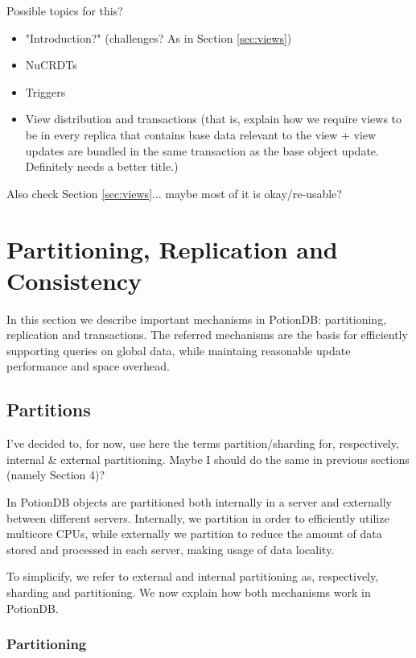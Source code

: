 \documentclass{vldb}
\newcommand{\grumbler}[2]{{\color{red}{\bf #1:} #2}}
\newcommand{\andre}[1]{\grumbler{andre}{#1}}
\begin{document}
\andre{Possible topics for this?}
\begin{itemize}
	\item "Introduction?" (challenges? As in Section \ref{sec:views})
	\item NuCRDTs
	\item Triggers
	\item View distribution and transactions (that is, explain how we require views to be in every replica that contains base data relevant to the view + view updates are bundled in the same transaction as the base object update. Definitely needs a better title.)
\end{itemize}

\andre{Also check Section \ref{sec:views}... maybe most of it is okay/re-usable?}


\section{Partitioning, Replication and Consistency}

In this section we describe important mechanisms in PotionDB: partitioning, replication and transactions.
The referred mechanisms are the basis for efficiently supporting queries on global data, while maintaing reasonable update performance and space overhead.

\subsection{Partitions}

\andre{I've decided to, for now, use here the terms partition/sharding for, respectively, internal \& external partitioning. Maybe I should do the same in previous sections (namely Section 4)?}

In PotionDB objects are partitioned both internally in a server and externally between different servers.
Internally, we partition in order to efficiently utilize multicore CPUs, while externally we partition to reduce the amount of data stored and processed in each server, making usage of data locality.

To simplicify, we refer to external and internal partitioning as, respectively, sharding and partitioning.
We now explain how both mechanisms work in PotionDB.

\subsubsection{Partitioning}
\end{document}
